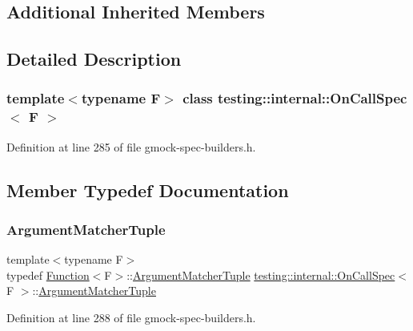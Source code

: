 \subsection*{Additional Inherited Members}


\subsection{Detailed Description}
\subsubsection*{template$<$typename F$>$\newline
class testing\+::internal\+::\+On\+Call\+Spec$<$ F $>$}



Definition at line 285 of file gmock-\/spec-\/builders.\+h.



\subsection{Member Typedef Documentation}
\mbox{\label{classtesting_1_1internal_1_1OnCallSpec_a3240f159f0a9d8cda208bc256da35074}} 
\subsubsection{\texorpdfstring{Argument\+Matcher\+Tuple}{ArgumentMatcherTuple}}
{\footnotesize\ttfamily template$<$typename F$>$ \\
typedef \hyperlink{structtesting_1_1internal_1_1Function}{Function}$<$F$>$\+::\hyperlink{classtesting_1_1internal_1_1OnCallSpec_a3240f159f0a9d8cda208bc256da35074}{Argument\+Matcher\+Tuple} \hyperlink{classtesting_1_1internal_1_1OnCallSpec}{testing\+::internal\+::\+On\+Call\+Spec}$<$ F $>$\+::\hyperlink{classtesting_1_1internal_1_1OnCallSpec_a3240f159f0a9d8cda208bc256da35074}{Argument\+Matcher\+Tuple}}



Definition at line 288 of file gmock-\/spec-\/builders.\+h.

\mbox{\label{classtesting_1_1internal_1_1OnCallSpec_a70ffab8b915b7b48a90f5ce256da806f}} 
